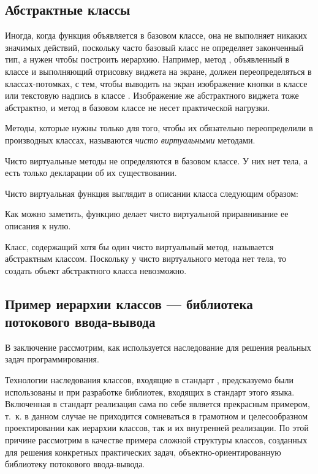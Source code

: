 \subsection[Абстрактные классы]{Абстрактные классы}
Иногда, когда функция объявляется в базовом классе, она не выполняет никаких значимых действий,
поскольку часто базовый класс не определяет законченный тип, а нужен чтобы построить иерархию. Например, метод
, объявленный в классе  и  выполняющий отрисовку виджета на
экране, должен переопределяться в классах-потомках, с тем, чтобы выводить на экран изображение кнопки в классе
 или текстовую надпись в классе . Изображение
же абстрактного виджета тоже абстрактно, и метод в базовом классе не несет практической нагрузки.

Методы, которые нужны только для того, чтобы их обязательно переопределили в производных классах, называются
\emph{чисто виртуальными} методами.

Чисто виртуальные методы не определяются в базовом классе. У них нет тела, а есть только декларации об их существовании.

Чисто виртуальная функция выглядит в описании класса следующим образом:


Как можно заметить, функцию делает чисто виртуальной приравнивание ее описания к нулю.

Класс, содержащий хотя бы один чисто виртуальный метод, называется абстрактным классом.
Поскольку у чисто виртуального метода нет тела, то создать объект абстрактного класса невозможно.

\subsection[Пример иерархии классов --- библиотека потокового ввода-вывода]{Пример иерархии классов --- библиотека
потокового ввода-вывода}\label{ch10:3.6}

В заключение рассмотрим, как используется наследование для решения реальных задач
программирования.

Технологии наследования классов, входящие в стандарт , предсказуемо были использованы и при разработке библиотек,
входящих в стандарт этого языка. Включенная в стандарт реализация сама по себе является прекрасным примером, т.~к. в
данном случае не приходится сомневаться в грамотном и целесообразном проектировании как иерархии классов, так и их
внутренней реализации. По этой причине рассмотрим в качестве примера сложной структуры классов, созданных для решения
конкретных практических задач,  объектно-ориентированную библиотеку потокового ввода-вывода. 

